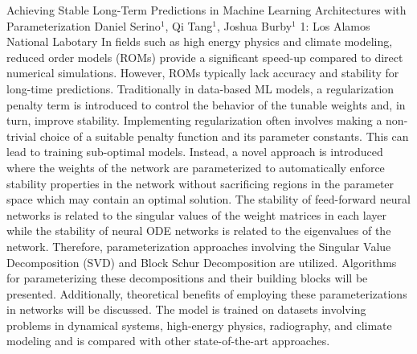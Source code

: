 \begin{addmargin}[2em]{0em}
\vspace{2ex}
\abs
{Achieving Stable Long-Term Predictions in Machine Learning Architectures with Parameterization}
{Daniel Serino$^{1}$, Qi Tang$^{1}$, Joshua Burby$^{1}$}
{1: Los Alamos National Labotary}
{In fields such as high energy physics and climate modeling, reduced order models (ROMs) provide a significant speed-up compared to direct numerical simulations. However, ROMs typically lack accuracy and stability for long-time predictions. Traditionally in data-based ML models, a regularization penalty term is introduced to control the behavior of the tunable weights and, in turn, improve stability. Implementing regularization often involves making a non-trivial choice of a suitable penalty function and its parameter constants. This can lead to training sub-optimal models. Instead, a novel approach is introduced where the weights of the network are parameterized to automatically enforce stability properties in the network without sacrificing regions in the parameter space which may contain an optimal solution. The stability of feed-forward neural networks is related to the singular values of the weight matrices in each layer while the stability of neural ODE networks is related to the eigenvalues of the network. Therefore, parameterization approaches involving the Singular Value Decomposition (SVD) and Block Schur Decomposition are utilized. Algorithms for parameterizing these decompositions and their building blocks will be presented. Additionally, theoretical benefits of employing these parameterizations in networks will be discussed. The model is trained on datasets involving problems in dynamical systems, high-energy physics, radiography, and climate modeling and is compared with other state-of-the-art approaches.
}



\end{addmargin}
